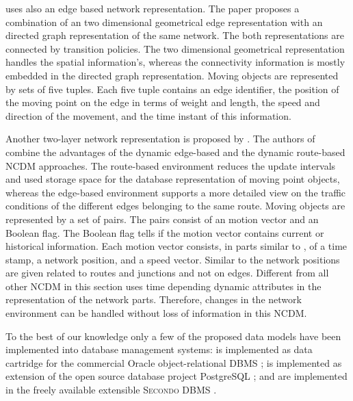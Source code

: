 \documentclass[a4paper]{article}
\newcommand{\secondo}{\textsc{Secondo}}
\begin{document}
\cite{NetworkJensen} uses also an edge based network representation. The paper
proposes a combination of an two dimensional geometrical edge representation with
an directed graph representation of the same network. The both representations
are connected by transition policies. The two dimensional
geometrical representation handles the spatial information's, whereas the
connectivity
information is mostly embedded in the directed graph representation.
Moving objects are represented by sets of five tuples. Each five tuple contains
an edge identifier, the position of the moving point on the edge
in terms of weight and length, the speed and direction of the movement, and
the time instant of this information.

Another two-layer network representation is proposed by
\cite{DynamicTransportNetworkDing}.
The authors of \cite{DynamicTransportNetworkDing} combine the advantages of the
dynamic edge-based \cite{DynNetworkModEdgeGueting} and the dynamic route-based
\cite{DynNetworkModRouteGueting} NCDM approaches. The route-based environment
reduces the update intervals and used storage space for the database representation
of moving point objects, whereas the edge-based environment supports
a more detailed view on the traffic conditions of the different edges belonging
to the same route. Moving objects are represented by a set of pairs. The pairs
consist of an motion vector and an Boolean flag. The Boolean flag tells if the
motion vector contains current or historical information. Each motion vector
consists, in parts similar to \cite{NetworkJensen}, of a time stamp, a network
position, and a speed vector. Similar to \cite{NetworkGueting} the network
positions are given related to routes and junctions and not on edges. Different
from all
other NCDM in this section \cite{DynamicTransportNetworkDing}
uses time depending dynamic attributes in the representation of the network parts.
Therefore, changes in the network environment can be handled without loss of
information in this NCDM.

To the best of our knowledge only a few of the proposed data models have been
implemented into database management systems: \cite{STAUPelekis} is implemented
as data cartridge \cite{HERMESMDCPelekis, HERMESPelekis} for the commercial
Oracle\textregistered{} object-relational DBMS \cite{oracle};
\cite{DynamicTransportNetworkDing} is implemented as extension of the open source
database project PostgreSQL \cite{PostgreSQL}; \cite{DataModelDataStructureGueting}
and \cite{NetworkGueting} are implemented in the freely available extensible
\secondo{} DBMS \cite{SecondoPlatformPrototypingGueting}.
\end{document}
